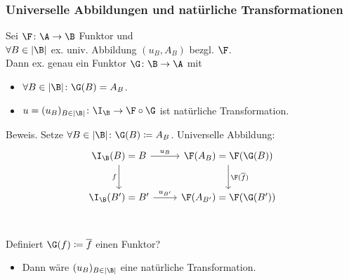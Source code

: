 \begin{frame}[fragile]
  \frametitle{Universelle Abbildungen und natürliche Transformationen}
  \begin{thm*}
    Sei $\F \colon \A \to \B$ Funktor und \\
    $\forall B \in |\B|$ ex. univ. Abbildung $(u_B, A_B)$ bezgl. $\F$. \\
    Dann ex. genau ein Funktor $\G \colon \B \to \A$ mit
    \pause
    \begin{itemize}
      \item $\forall B \in |\B| \colon \G(B) = A_B$.
      \item $u = (u_B)_{B \in |\B|} \colon \I_\B \to \F \circ \G$ ist natürliche Transformation.
    \end{itemize}
  \end{thm*}
  \pause

  \begin{block}{Beweis.}
  Setze $\forall B \in |\B| \colon \G(B) \coloneqq A_B$. Universelle Abbildung:
    \pause
    $$
    \begin{tikzcd}[row sep=2.5em]
      \I_\B(B)  = B \arrow[r,"u_B"] \arrow[d,"f"'] & \F(A_B)     = \F(\G(B)) \arrow[d,"\F(\overline f)"] 
      \\ 
      \I_\B(B') = B'\arrow[r,"u_{B'}"]              & \F(A_{B'})  = \F(\G(B')) \\
    \end{tikzcd}
    $$
    \pause
    Definiert $\G(f) \coloneqq \overline f$ einen Funktor? 
    \begin{itemize}
      \item Dann w\"are $(u_B)_{B \in |\B|}$ eine nat\"urliche Transformation.
    \end{itemize}
  \end{block}
\end{frame}

